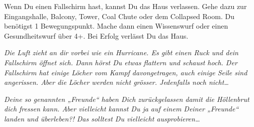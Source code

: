 \newpage


Wenn Du einen Fallschirm hast, kannst Du das Haus verlassen. Gehe dazu zur Eingangshalle,
Balcony, Tower, Coal Chute oder dem Collapsed Room. Du benötigst 1 Bewegungspunkt.
Mache dann einen Wissenswurf oder einen Gesundheitswurf über 4+. Bei Erfolg verlässt Du das Haus.

{\itshape
Die Luft zieht an dir vorbei wie ein Hurricane. Es gibt einen Ruck und dein Fallschirm öffnet sich. Dann hörst Du etwas flattern und schaust hoch. Der Fallschirm hat einige Löcher vom Kampf davongetragen, auch einige Seile sind angerissen. Aber die Löcher werden nicht grösser. Jedenfalls noch nicht…
}

{ \itshape Deine so genannten „Freunde“ haben Dich zurückgelassen damit die Höllenbrut dich fressen kann. Aber vielleicht kannst Du ja auf einem Deiner „Freunde“ landen und überleben?! Das solltest Du vielleicht ausprobieren… }